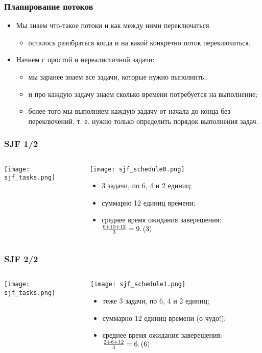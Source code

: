 \begin{frame}
\frametitle{Планирование потоков}
\begin{itemize}
  \item Мы знаем что-такое потоки и как между ними переключаться
  \begin{itemize}
    \item осталось разобраться когда и на какой конкретно поток переключаться.
  \end{itemize}
  \item Начнем с простой и нереалистичной задачи:
  \begin{itemize}
    \item мы заранее знаем все задачи, которые нужно выполнить;
    \item и про каждую задачу знаем сколько времени потребуется на выполнение;
    \item более того мы выполняем каждую задачу от начала до конца без
    переключений, т. е. нужно только определить порядок выполнения задач.
  \end{itemize}
\end{itemize}
\end{frame}

\begin{frame}
\frametitle{SJF 1/2}
\begin{columns}
  \begin{column}{0.5\linewidth}
    \texttt{[image: sjf\_tasks.png]}
  \end{column}
  \begin{column}{0.5\linewidth}
    \texttt{[image: sjf\_schedule0.png]}
    \begin{itemize}
      \item 3 задачи, по 6, 4 и 2 единиц;
      \item суммарно 12 единиц времени;
      \item среднее время ожидания заверешения:
      ${{6+10+12}\over{3}}=9.\left(3\right)$
    \end{itemize}
  \end{column}
\end{columns}
\end{frame}

\begin{frame}
\frametitle{SJF 2/2}
\begin{columns}
  \begin{column}{0.5\linewidth}
    \texttt{[image: sjf\_tasks.png]}
  \end{column}
  \begin{column}{0.5\linewidth}
    \texttt{[image: sjf\_schedule1.png]}
    \begin{itemize}
      \item теже 3 задачи, по 6, 4 и 2 единиц;
      \item суммарно 12 единиц времени (о чудо!);
      \item среднее время ожидания заверешения:
      ${{2+6+12}\over{3}}=6.\left(6\right)$
    \end{itemize}
  \end{column}
\end{columns}
\end{frame}

